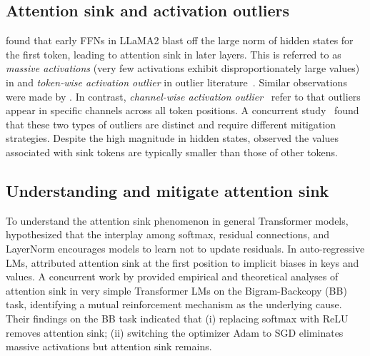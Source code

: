 \documentclass{article} \usepackage{iclr2025_conference,times}
\begin{document}
\subsection{Attention sink and activation outliers}
\vspace{-0.05cm}
\citet{cancedda2024spectral} found that early FFNs in LLaMA2 blast off the large norm of hidden states for the first token, leading to attention sink in later layers. This is referred to as \textit{massive activations} (very few activations exhibit disproportionately large values) in \citet{sun2024massive} and \textit{token-wise activation outlier} in outlier literature~\citep{lin2024duquant}. Similar observations were made by \citet{bondarenko2023quantizable}. In contrast, \textit{channel-wise activation outlier}~\citep{dettmers2022gpt3, xiao2023smoothquant} refer to that outliers appear in specific channels across all token positions. A concurrent study~\citep{kaul2024attention} found that these two types of outliers are distinct and require different mitigation strategies. Despite the high magnitude in hidden states, \citet{bondarenko2023quantizable, guo2024attention} observed the values associated with sink tokens are typically smaller than those of other tokens.

\vspace{-0.05cm}
\subsection{Understanding and mitigate attention sink}
\vspace{-0.05cm}
To understand the attention sink phenomenon in general Transformer models, \citet{bondarenko2023quantizable} hypothesized that the interplay among softmax, residual connections, and LayerNorm encourages models to learn not to update residuals. In auto-regressive LMs, \citet{sun2024massive} attributed attention sink at the first position to implicit biases in keys and values. A concurrent work by \citet{guo2024active} provided empirical and theoretical analyses of attention sink in very simple Transformer LMs on the Bigram-Backcopy (BB) task, identifying a mutual reinforcement mechanism as the underlying cause. Their findings on the BB task indicated that (i) replacing softmax with ReLU removes attention sink; (ii) switching the optimizer Adam to SGD eliminates massive activations but attention sink remains. 
\end{document}
